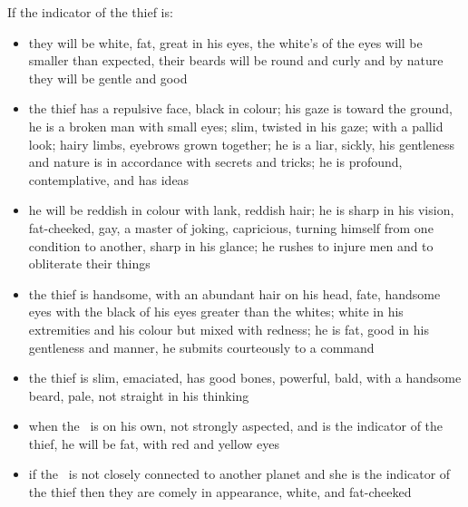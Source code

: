If the indicator of the thief is:
\begin{itemize}[topsep=0em,itemsep=0em]
\item[\Jupiter] they will be white, fat, great in his eyes, the white's of the eyes will be smaller than expected, their beards will be round and curly and by nature they will be gentle and good
\item[\Saturn] the thief has a  repulsive face, black in colour; his gaze is toward the ground, he is a broken man with small eyes; slim, twisted in his gaze; with a pallid look; hairy limbs, eyebrows grown together; he is a liar, sickly, his gentleness and nature is in accordance with secrets and tricks; he is profound, contemplative, and has ideas
\item[\Mars] he will be reddish in colour with lank, reddish hair; he is sharp in his vision, fat-cheeked, gay, a master of joking, capricious, turning himself from one condition to another, sharp in his glance; he rushes to injure men and to obliterate their things
\item[\Venus]  the thief is handsome, with an abundant hair on his head, fate, handsome eyes with the black of his eyes greater than the whites; white in his extremities and his colour but mixed with redness; he is fat, good in his gentleness and manner, he submits courteously to a command
\item[\Mercury] the thief is slim, emaciated, has good bones, powerful, bald, with a handsome beard, pale, not straight in his thinking
\item[\Sun] when the \Sun\, is on his own, not strongly aspected, and is the indicator of the thief, he will be fat, with red and yellow eyes
\item[\Moon] if the \Moon\, is not closely connected to another planet and she is the indicator of the thief then they are comely in appearance, white, and fat-cheeked
\end{itemize}



